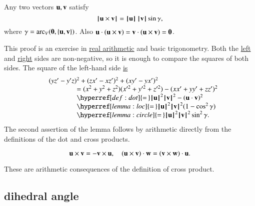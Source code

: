 \begin{lemma}[]  
Any two vectors ${\mathbf u},{\mathbf v}$ satisfy
\begin{displaymath}{{\hskip0.1em|\hskip-0.15em|\hskip0.1em}{\mathbf u}\times {\mathbf v}{\hskip0.1em|\hskip-0.15em|\hskip0.1em}} =
  {{\hskip0.1em|\hskip-0.15em|\hskip0.1em}{\mathbf u}{\hskip0.1em|\hskip-0.15em|\hskip0.1em}}\,{{\hskip0.1em|\hskip-0.15em|\hskip0.1em}{\mathbf v}{\hskip0.1em|\hskip-0.15em|\hskip0.1em}}\sin\gamma,\end{displaymath}
where $\gamma=\operatorname{arc}_V({\mathbf 0},\{{\mathbf u},{\mathbf v}\})$.
Also ${\mathbf u} \cdot ({\mathbf u}\times {\mathbf v}) = {\mathbf v}\cdot ({\mathbf u}\times {\mathbf v}) = {\mathbf 0}$.
\end{lemma}

\begin{proved} This proof is an exercise in
  \hyperref[back:analysis]{real arithmetic} and basic trigonometry.
  Both the \hyperref[eqn:dot]{left} and
  \hyperref[lemma:sin-pos]{right} sides are non-negative, so it is
  enough to compare the squares of both sides.  The square of the
  left-hand side \hyperref[def:cross]{is}
\begin{displaymath}
\begin{array}{lll}
  &(y z'- y'z)^2 + (z x' - x z')^2 + (x y' - y x')^2 \\
  &\qquad\qquad=
  (x^2 + y^2 + z^2)(x'^2 + y'^2 + z'^2) - (x x' + y y' + z z')^2
  \\&\qquad\qquad \hyperref[def:dot]{=\,} 
  \normo{\u}^2\normo{\v}^2 - (\u\cdot \v)^2 \\
  &\qquad\qquad\hyperref[lemma:loc]{=\,} 
  \normo{\u}^2\normo{\v}^2 ( 1 - \cos^2\gamma)\\
  &\qquad\qquad\hyperref[lemma:circle]{=\,} 
\normo{\u}^2\normo{\v}^2 \sin^2\gamma.
\end{array}
\end{displaymath}
The second assertion of the lemma follows by arithmetic directly from
the definitions of the dot and cross products.  \swallowed\end{proved}


\begin{lemma}[]
\begin{displaymath}
{\mathbf u}\times {\mathbf v} = -{\mathbf v}\times {\mathbf u},\quad
({\mathbf u}\times {\mathbf v})\cdot {\mathbf w} = ({\mathbf v}\times {\mathbf w})\cdot {\mathbf u}.
\end{displaymath}
\end{lemma}

\begin{proved}
These are arithmetic consequences of the definition of cross product.
\swallowed\end{proved}



\subsection{dihedral angle}

